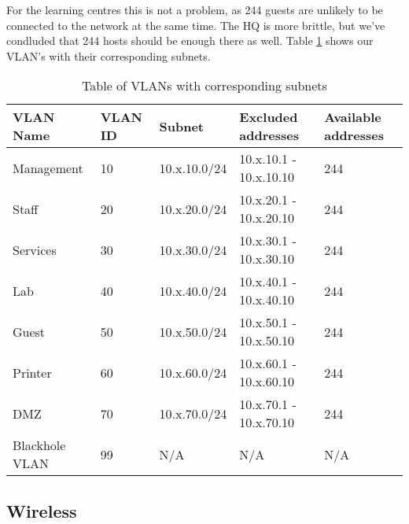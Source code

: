 For the learning centres this is not a problem, as 244 guests are unlikely to be connected to the network at the same time. The HQ is more brittle, but we've condluded that 244 hosts should be enough there as well. Table \ref{vlansubnettable} shows our VLAN's with their corresponding subnets.


\begin{table}[H]
\caption{Table of VLANs with corresponding subnets}
\label{vlansubnettable}
\begin{tabular}{|l|l|l|l|l|}
\hline
\textbf{VLAN Name} & \textbf{VLAN ID} & \textbf{Subnet} & \textbf{Excluded addresses} & \textbf{Available addresses} \\ \hline

Management     & 10      & 10.x.10.0/24 & 10.x.10.1 - 10.x.10.10 & 244 \\ \hline
Staff          & 20      & 10.x.20.0/24 & 10.x.20.1 - 10.x.20.10 & 244 \\ \hline
Services       & 30      & 10.x.30.0/24 & 10.x.30.1 - 10.x.30.10 & 244 \\ \hline
Lab            & 40      & 10.x.40.0/24 & 10.x.40.1 - 10.x.40.10 & 244 \\ \hline
Guest          & 50      & 10.x.50.0/24 & 10.x.50.1 - 10.x.50.10 & 244 \\ \hline
Printer        & 60      & 10.x.60.0/24 & 10.x.60.1 - 10.x.60.10 & 244 \\ \hline
DMZ            & 70      & 10.x.70.0/24 & 10.x.70.1 - 10.x.70.10 & 244 \\ \hline
Blackhole VLAN & 99      & N/A          & N/A                    & N/A \\ \hline
\end{tabular}
\end{table}

\subsection{Wireless}


